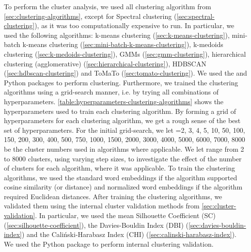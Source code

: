 To perform the cluster analysis, we used all clustering algorithm from \cref{sec:clustering-algorithms}, except for Spectral clustering (\cref{sec:spectral-clustering}), as it was too computationally expensive to run. In particular, we used the following algorithms: k-means clustering (\cref{sec:k-means-clustering}), mini-batch k-means clustering (\cref{sec:mini-batch-k-means-clustering}), k-medoids clustering (\cref{sec:k-medoids-clustering}), GMMs (\cref{sec:gmm-clustering}), hierarchical clustering (agglomerative) (\cref{sec:hierarchical-clustering}), HDBSCAN (\cref{sec:hdbscan-clustering}) and ToMaTo (\cref{sec:tomato-clustering}). We used the  \cite{ScikitLearn2011} and  \cite{mcinnes2017hdbscan} Python packages to perform clustering. Furthermore, we trained the clustering algorithms using a grid-search manner, i.e. by trying all combinations of hyperparameters. \cref{table:hyperparameters-clustering-algorithms} shows the hyperparameters used to train each clustering algorithm. By forming a grid of hyperparameters for each clustering algorithm, we get a rough sense of the best set of hyperparameters. For the initial grid-search, we let =2, 3, 4, 5, 10, 50, 100, 150, 200, 300, 400, 500, 750, 1000, 1500, 2000, 3000, 4000, 5000, 6000, 7000, 8000 be the cluster numbers used in algorithms where applicable. We let  range from 2 to 8000 clusters, using varying step sizes, to investigate the effect of the number of clusters for each algorithm, where it was applicable. To train the clustering algorithms, we used the standard word embeddings if the algorithm supported cosine similarity (or distance) and normalized word embeddings if the algorithm required Euclidean distances. After training the clustering algorithms, we validated them using the internal cluster validation methods from \cref{sec:cluster-validation}. In particular, we used the mean Silhouette Coefficient (SC) (\cref{sec:silhouette-coefficient}), the Davies-Bouldin Index (DBI) (\cref{sec:davies-bouldin-index}) and the Caliński-Harabasz Index (CHI) (\cref{sec:calinski-harabasz-index}). We used the  Python package to perform internal clustering validation.

